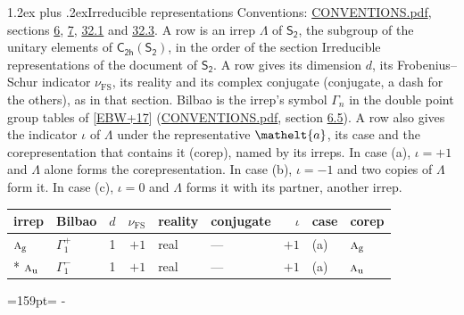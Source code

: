 \documentclass[10pt,a4paper]{article}
\makeatletter
\renewcommand\section{\@startsection{section}{1}{\z@}{-3ex plus -1ex minus -.2ex}%
  {1.2ex plus .2ex}{\normalfont\large\sffamily\bfseries\color{parttitle}}}
\newcommand{\needspace}[1]{\par\penalty-100\begingroup\dimen0=#1\relax\dimen2=\pagegoal
  \advance\dimen2-\pagetotal\ifdim\dimen0>\dimen2\relax\ifdim\dimen2>0pt\vfil\break\fi\fi
  \endgroup}
\numberwithin{equation}{section}
\newcommand{\eltfont}[1]{{\let\sigma\eltsigma\mathelt{#1}}}
\newcommand{\grp}[1]{\mathsf{#1}}
\newcommand{\irr}[1]{\text{\normalfont\scshape #1}}
\newcommand{\elt}[1]{\eltfont{#1}}
\newcommand{\ptag}[1]{\mathrm{#1}}
\newcommand{\fsind}{\nu_{\mathrm{FS}}}
\makeatother
\begin{document}
\section{Irreducible representations}\label{s:irreps}
Conventions: \href{../../CONVENTIONS.pdf}{CONVENTIONS.pdf}, sections \href{../../../rotation/CONVENTIONS.pdf\#conv.6}{6}, \href{../../../rotation/CONVENTIONS.pdf\#conv.7}{7}, \href{../../CONVENTIONS.pdf\#conv.32.1}{32.1} and \href{../../CONVENTIONS.pdf\#conv.32.3}{32.3}.
\leavevmode\label{n:irrep.Delta}A row is an irrep $\Lambda$ of $\grp{S_{2}}$, the subgroup of the unitary elements of $\grp{C_{2h}}(\grp{S_{2}})$, in the order of the section Irreducible representations of the document of \href{../../../rotation/data/pdf/S2.pdf}{$\grp{S_{2}}$}. \label{n:index.dimension}\label{n:index.frobenius}\label{n:head.irrep}\label{n:head.reality}\label{n:head.conjugate}A row gives its dimension $d$, its Frobenius--Schur indicator $\fsind$, its reality and its complex conjugate (conjugate, a dash for the others), as in that section. \label{n:head.bilbao}\label{n:irrep.alias.gamma}Bilbao is the irrep's symbol $\Gamma_n$ in the double point group tables of [\href{../../../REFERENCES.pdf\#ref.EBW+17}{EBW+17}] (\href{../../CONVENTIONS.pdf}{CONVENTIONS.pdf}, section \href{../../../rotation/CONVENTIONS.pdf\#conv.6.5}{6.5}). \label{n:head.case.corep}\label{n:head.corep}A row also gives the indicator $\iota$ of $\Lambda$ under the representative $\elt{a}$, its case and the corepresentation that contains it (corep), named by its irreps. In case (a), $\iota = +1$ and $\Lambda$ alone forms the corepresentation. In case (b), $\iota = -1$ and two copies of $\Lambda$ form it. In case (c), $\iota = 0$ and $\Lambda$ forms it with its partner, another irrep.
\setlength{\emergencystretch}{2em}\par\setlength{\emergencystretch}{0pt}
{\small\renewcommand{\arraystretch}{1.25}\setlength{\tabcolsep}{4pt}\begin{longtable}{@{}llrrllrll@{}}\toprule
irrep & Bilbao & $d$ & $\fsind$ & reality & conjugate & $\iota$ & case & corep\\\midrule\endhead
\bottomrule\endfoot\endlastfoot
$\irr{a}_{\ptag{g}}$ & $\Gamma_{1}^{+}$ & 1 & $+1$ & real & --- & $+1$ & (a) & $\irr{a}_{\ptag{g}}$\\*
$\irr{a}_{\ptag{u}}$ & $\Gamma_{1}^{-}$ & 1 & $+1$ & real & --- & $+1$ & (a) & $\irr{a}_{\ptag{u}}$\\
\bottomrule\end{longtable}}
\needspace{159pt}
\end{document}
